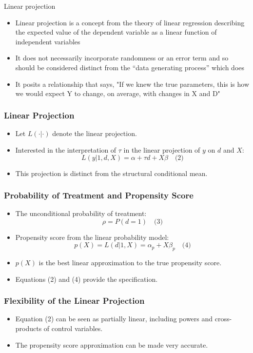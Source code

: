 \documentclass{beamer}
\begin{document}
\begin{frame}{Linear projection}

\begin{itemize}
\item Linear projection is a concept from the theory of linear regression describing the expected value of the dependent variable as a linear function of independent variables 
\item It does not necessarily incorporate randomness or an error term and so should be considered distinct from the ``data generating process'' which does
\item It posits a relationship that says, "If we knew the true parameters, this is how we would expect Y to change, on average, with changes in X and D"
\end{itemize}

\end{frame}


\begin{frame}
\frametitle{Linear Projection}
\begin{itemize}
    \item Let \( L(\cdot | \cdot) \) denote the linear projection.
    \item Interested in the interpretation of \( \tau \) in the linear projection of \( y \) on \( d \) and \( X \):
    \[ L(y | 1, d, X) = \alpha + \tau d + X\beta \quad \text{(2)} \]
    \item This projection is distinct from the structural conditional mean.
\end{itemize}
\end{frame}

\begin{frame}
\frametitle{Probability of Treatment and Propensity Score}
\begin{itemize}
    \item The unconditional probability of treatment:
    \[ \rho = P(d = 1) \quad \text{(3)} \]
    \item Propensity score from the linear probability model:
    \[ p(X) = L(d | 1, X) = \alpha_p + X\beta_p \quad \text{(4)} \]
    \item \( p(X) \) is the best linear approximation to the true propensity score.
    \item Equations (2) and (4) provide the specification.
\end{itemize}
\end{frame}

\begin{frame}
\frametitle{Flexibility of the Linear Projection}
\begin{itemize}
    \item Equation (2) can be seen as partially linear, including powers and cross-products of control variables.
    \item The propensity score approximation can be made very accurate.
\end{itemize}
\end{frame}
\end{document}
